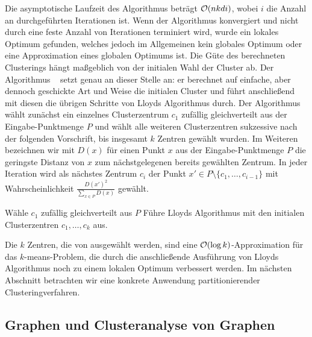Die asymptotische Laufzeit des Algorithmus beträgt $\mathcal{O}(nkdi)$, wobei $i$ die Anzahl an durchgeführten Iterationen ist.
Wenn der Algorithmus konvergiert und nicht durch eine feste Anzahl von Iterationen terminiert wird, wurde ein lokales
Optimum gefunden, welches jedoch im Allgemeinen kein globales Optimum oder eine Approximation eines globalen Optimums ist.
Die Güte des berechneten Clusterings hängt maßgeblich von der initialen Wahl der Cluster ab. Der Algorithmus
\kmpp~\cite{ArthurV07} setzt genau an dieser Stelle an: er berechnet auf einfache, aber dennoch geschickte Art und Weise
die initialen Cluster und führt anschließend mit diesen die übrigen Schritte von Lloyds Algorithmus durch.
Der Algorithmus wählt zunächst ein einzelnes Clusterzentrum $c_1$ zufällig gleichverteilt aus der Eingabe-Punktmenge $P$ und
wählt alle weiteren Clusterzentren sukzessive nach der folgenden Vorschrift, bis insgesamt $k$ Zentren gewählt wurden.
Im Weiteren bezeichnen wir mit $D(x)$ für einen Punkt $x$ aus der Eingabe-Punktmenge $P$ die geringste Distanz von $x$ zum
nächstgelegenen bereits gewählten Zentrum. In jeder Iteration wird als nächstes Zentrum $c_i$ der Punkt
$x' \in P \setminus \{ c_1, \dots, c_{i-1} \}$ mit Wahrscheinlichkeit $\frac{D(x')^2}{\sum_{x \in P} D(x)}$ gewählt.

\begin{algorithm}[H]
\label{algo:kmeanspp}
\caption{\kmpp}
	\DontPrintSemicolon
	
	\BlankLine
	
	Wähle $c_1$ zufällig gleichverteilt aus $P$\;
	Führe Lloyds Algorithmus mit den initialen Clusterzentren $c_1, \dots, c_k$ aus.
\end{algorithm}
Die $k$ Zentren, die von \kmpp{} ausgewählt werden, sind eine $\mathcal{O}(\log k)$-Approximation für das $k$-means-Problem, die durch
die anschließende Ausführung von Lloyds Algorithmus noch zu einem lokalen Optimum verbessert werden.
\absatz
Im nächsten Abschnitt betrachten wir eine konkrete Anwendung partitionierender Clusteringverfahren.

\subsection{Graphen und Clusteranalyse von Graphen}
\label{subsection:basics:graphs}

